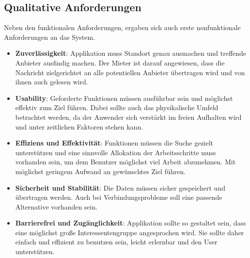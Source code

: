 \subsection{Qualitative Anforderungen} 
Neben den funktionalen Anforderungen, ergaben sich auch erste nonfunktionale Anforderungen an das System.

\begin{itemize}
   \item 
   \textbf{Zuverlässigkeit}: Applikation muss Standort genau ausmachen und treffende Anbieter ausfindig machen. Der Mieter ist darauf angewiesen, dass die Nachricht zielgerichtet an alle  
   potentiellen Anbieter übertragen wird und von ihnen auch gelesen wird.
   
   \item
   \textbf{Usability}: Geforderte Funktionen müssen ausführbar sein und möglichst effektiv zum Ziel führen. Dabei sollte auch das physikalische Umfeld betrachtet werden, da der Anwender sich verstärkt im freien Aufhalten wird und unter zeitlichen Faktoren stehen kann.
   
   \item 
   \textbf{Effiziens und Effektivität}: Funktionen müssen die Suche gezielt unterstützen und eine sinnvolle Allokation der Arbeitsschritte muss vorhanden sein, um dem Benutzer möglichst viel Arbeit abzunehmen. Mit möglichst geringem Aufwand an gewünschtes Ziel führen.   
   
   \item
   \textbf{Sicherheit und Stabilität}: Die Daten müssen sicher gespeichert und übertragen werden. Auch bei Verbindungsprobleme soll eine passende Alternative vorhanden sein.

   \item
   \textbf{Barrierefrei und Zugänglichkeit}: Applikation sollte so gestaltet sein, dass eine möglichst große Interessentengruppe angesprochen wird. Sie sollte daher einfach und effizient zu benutzen sein, leicht erlernbar und den User unterstützen.
 

\end{itemize}




